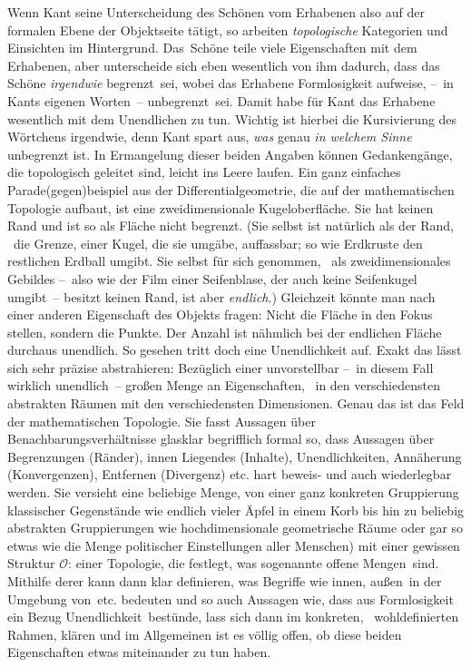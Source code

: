Wenn Kant seine Unterscheidung des Schönen vom Erhabenen also auf der formalen
  Ebene der Objektseite tätigt, so arbeiten \emph{topologische} Kategorien und
  Einsichten im Hintergrund.
Das~Schöne teile viele Eigenschaften mit dem Erhabenen, aber unterscheide sich
  eben wesentlich von ihm dadurch, dass das Schöne \emph{irgendwie} \glqq
  begrenzt\grqq\ sei, wobei das Erhabene Formlosigkeit aufweise, \dhei
  --~in Kants eigenen Worten~-- \glqq unbegrenzt\grqq\ sei.
Damit habe für Kant das Erhabene wesentlich mit dem Unendlichen zu tun.
Wichtig ist hierbei die Kursivierung des Wörtchens \glqq irgendwie\grqq, denn
  Kant spart aus, \emph{was} genau \emph{in welchem Sinne} unbegrenzt ist.
In Ermangelung dieser beiden Angaben können Gedankengänge, die topologisch
  geleitet sind, leicht ins Leere laufen.
Ein ganz einfaches Parade(gegen)beispiel aus der Differentialgeometrie, die
  auf der mathematischen Topologie aufbaut, ist eine zweidimensionale
  Kugeloberfläche.
Sie hat keinen Rand und ist so als Fläche nicht begrenzt.
(Sie selbst ist natürlich als der Rand, \dhei\ die Grenze, einer Kugel, die sie
  umgäbe, auffassbar; so wie Erdkruste den restlichen Erdball umgibt.
Sie selbst für sich genommen, \dhei\ als zweidimensionales Gebildes --~also
  wie der Film einer Seifenblase, der auch keine Seifenkugel umgibt~-- besitzt
  keinen Rand, ist aber \emph{endlich}.)
Gleichzeit könnte man nach einer anderen Eigenschaft des Objekts fragen: Nicht
  die Fläche in den Fokus stellen, sondern die Punkte. Der Anzahl ist nähmlich
  bei der endlichen Fläche durchaus unendlich. So gesehen tritt doch eine
  Unendlichkeit auf.
Exakt das lässt sich sehr präzise abstrahieren: Bezüglich einer unvorstellbar
  --~in diesem Fall wirklich unendlich~-- großen Menge an Eigenschaften, \dhei\
  in den verschiedensten abstrakten Räumen mit den verschiedensten
  Dimensionen.
Genau das ist das Feld der mathematischen Topologie.
Sie fasst Aussagen über Benachbarungsverhältnisse glasklar begrifflich formal
  so, dass Aussagen über Begrenzungen (Ränder), innen Liegendes (Inhalte),
  Unendlichkeiten, Annäherung (Konvergenzen), Entfernen (Divergenz) etc. hart
  beweis- und auch wiederlegbar werden.
Sie versieht eine beliebige Menge, von einer ganz konkreten Gruppierung
  klassischer Gegenstände wie endlich vieler Äpfel in einem Korb bis hin zu
  beliebig abstrakten Gruppierungen wie hochdimensionale geometrische Räume
  oder gar so etwas wie die Menge politischer Einstellungen aller Menschen) 
  mit einer gewissen Struktur $\mathcal{O}$: einer Topologie, die festlegt,
  was sogenannte \glqq offene Mengen\grqq\ sind.
Mithilfe derer kann dann klar definieren, was Begriffe wie \glqq innen\grqq,
  \glqq außen\grqq\, \glqq in der Umgebung von\grqq\ etc. bedeuten und so auch
  Aussagen wie, dass aus \glqq Formlosigkeit ein Bezug Unendlichkeit\grqq\
  bestünde, lass sich dann im konkreten, \dhei\ wohldefinierten Rahmen, klären
  und im Allgemeinen ist es völlig offen, ob diese beiden Eigenschaften etwas
  miteinander zu tun haben.

